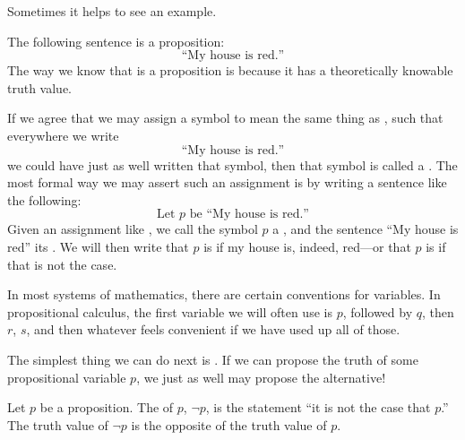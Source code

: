 Sometimes it helps to see an example.

\begin{ex}
  The following sentence is a proposition:
  \begin{equation}
    \text{``My house is red.''}
    \label{eq:ex:proposition}
  \end{equation}
  The way we know that  is a proposition is because
  it has a theoretically knowable truth value.

  If we agree that we may assign a symbol to mean the same thing as
  ,
  such that everywhere we write
  \begin{equation*}
    \text{``My house is red.''}
  \end{equation*}
  we could have just as well written that symbol, then that symbol is called
  a .
  The most formal way we may assert such an assignment is by writing
  a sentence like the following:
  \begin{equation}
    \text{Let $p$ be ``My house is red.''}
    \label{eq:propostional-symbolic-notation}
  \end{equation}
  Given an assignment like ,
  we call the symbol $p$ a ,
  and the sentence ``My house is red'' its .
  We will then write that $p$ is \ltrue{} if my house is, indeed,
  red---or that $p$ is \lfalse{} if that is not the case.
\end{ex}

In most systems of mathematics, there are certain conventions for variables.
In propositional calculus, the first variable we will often use is $p$, followed
by $q$, then $r$, $s$, and then whatever feels convenient if we have used up
all of those.

The simplest thing we can do next is .
If we can propose the truth of some propositional variable $p$,
we just as well may propose the alternative!
\begin{defn}[negation]
  Let $p$ be a proposition.
  The  of $p$,
  $\neg p$,
  is the statement
  ``it is not the case that \(p\).''
  The truth value of \(\neg p\) is the opposite of the truth value of \(p\).
  \label{defn:propositional-negation}
\end{defn}

